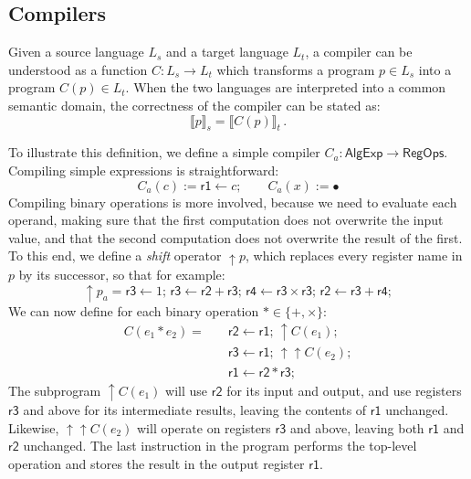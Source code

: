 \documentclass[acmsmall,10pt,review,anonymous]{acmart}
\newcommand{\kw}[1]{\ensuremath{ \textsf{#1} }}
\begin{document}

\subsection{Compilers} %

Given a source language $L_s$
and a target language $L_t$,
a compiler can be understood as a function
$C : L_s \rightarrow L_t$
which transforms a program $p \in L_s$
into a program $C(p) \in L_t$.
When the two languages are interpreted into
a common semantic domain,
the correctness of the compiler can be stated as:
\[
  \llbracket p \rrbracket_s = \llbracket C(p) \rrbracket_t \,.
\]

{\color{gray} %

\begin{example}[\kw{AlgExp} to \kw{RegOps}] %
To illustrate this definition,
we define a simple compiler $C_a : \kw{AlgExp} \rightarrow \kw{RegOps}$.
Compiling simple expressions is straightforward:
\[
  C_a(c) := \kw{r1} \leftarrow c; \qquad
  C_a(x) := \bullet
\]
Compiling binary operations is more involved,
because we need to evaluate each operand,
making sure that the first computation does not overwrite
the input value,
and that the second computation does not overwrite
the result of the first.
To this end,
we define a \emph{shift} operator ${\uparrow} p$,
which replaces every register name in $p$ by its successor,
so that for example:
\[
  {\uparrow} p_a =
  \kw{r3} \leftarrow 1; \,
  \kw{r3} \leftarrow \kw{r2} + \kw{r3}; \,
  \kw{r4} \leftarrow \kw{r3} \times \kw{r3}; \,
  \kw{r2} \leftarrow \kw{r3} + \kw{r4};
\]
We can now define for each binary operation $* \in \{+, \times\}$:
\begin{align*}
  C(e_1 * e_2) = \quad  %
    &\kw{r2} \leftarrow \kw{r1}; \, %
    {\uparrow} C(e_1); \\
    &\kw{r3} \leftarrow \kw{r1}; \,
    {\uparrow\uparrow} C(e_2); \\
    &\kw{r1} \leftarrow \kw{r2} * \kw{r3};
\end{align*}
The subprogram ${\uparrow} C(e_1)$
will use $\kw{r2}$ for its input and output,
and use registers $\kw{r3}$ and above for its intermediate results,
leaving the contents of $\kw{r1}$ unchanged.
Likewise,
${\uparrow\uparrow} C(e_2)$
will operate on registers $\kw{r3}$ and above,
leaving both $\kw{r1}$ and $\kw{r2}$ unchanged.
The last instruction in the program performs
the top-level operation and stores the result
in the output register $\kw{r1}$.
\end{example}

}
\end{document}
